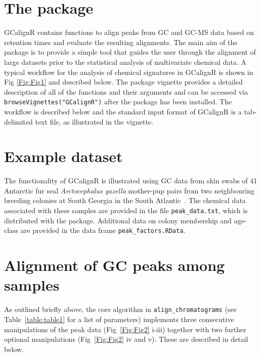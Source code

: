\documentclass[10pt,letterpaper]{article}
\begin{document}
\section*{The package}
GCalignR contains functions to align peaks from GC and GC-MS data based on retention times and evaluate the resulting alignments. The main aim of the package is to provide a simple tool that guides the user through the alignment of large datasets prior to the statistical analysis of multivariate chemical data. A typical workflow for the analysis of chemical signatures in GCalignR is shown in Fig \ref{Fig:Fig1} and described below. The package vignette provides a detailed description of all of the functions and their arguments and can be accessed via \texttt{browseVignettes("GCalignR")} after the package has been installed. The workflow is described below and the standard input format of GCalignR is a tab-delimited text file, as illustrated in the vignette.

\section*{Example dataset}
The functionality of GCalignR is illustrated using GC data from skin swabs of 41 Antarctic fur seal \textit{Arctocephalus gazella} mother-pup pairs from two neighbouring breeding colonies at South Georgia in the South Atlantic~\cite{Stoffel.2015}. The chemical data associated with these samples are provided in the file \texttt{peak\_data.txt}, which is distributed with the package. Additional data on colony membership and age-class are provided in the data frame \texttt{peak\_factors.RData}.

\section*{Alignment of GC peaks among samples}
As outlined briefly above, the core algorithm in \texttt{align\_chromatograms} (see Table~\ref{table:table1} for a list of parameters) implements three consecutive manipulations of the peak data (Fig~\ref{Fig:Fig2} i-iii) together with two further optional manipulations (Fig~\ref{Fig:Fig2} iv and v). These are described in detail below.
\end{document}
